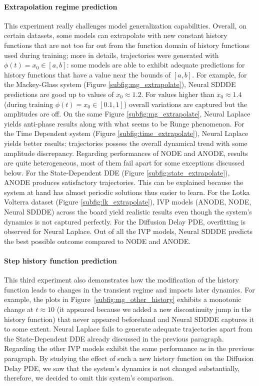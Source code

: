 

\paragraph{Extrapolation regime prediction} This experiment really challenges model generalization capabilities. Overall, on certain datasets, some models can extrapolate with new constant history functions that are not too far out from the function domain of history functions used during training; more in details,  trajectories were generated with $\phi(t) = x_0\in [a,b]$: some models are able to exhibit adequate predictions for history functions that have a value near the bounds of $[a,b]$. For example, for the Mackey-Glass system (Figure \ref{subfig:mg_extrapolate}), Neural SDDDE predictions are good up to values of $x_0 \approx 1.2$. For values higher than  $x_0 \approx 1.4$ (during training $\phi(t) = x_0 \in [0.1,1] $) overall variations are captured but the amplitudes are off. On the same Figure \ref{subfig:mg_extrapolate}, Neural Laplace yields anti-phase results along with what seems to be Runge phenomenon. For the Time Dependent system (Figure \ref{subfig:time_extrapolate}), Neural Laplace yields better results: trajectories possess the overall dynamical trend with some amplitude discrepancy. Regarding performances of NODE and ANODE, results are quite heterogeneous, most of them fail apart for some exceptions discussed below. For the State-Dependent DDE (Figure \ref{subfig:state_extrapolate}), ANODE produces satisfactory trajectories. This can be explained because the system at hand has almost periodic solutions thus easier to learn. For the Lotka Volterra dataset (Figure \ref{subfig:lk_extrapolate}), IVP models (ANODE, NODE, Neural SDDDE) across the board yield realistic results even though the system's dynamics is not captured perfectly. For the Diffusion Delay PDE, overfitting is observed for Neural Laplace. Out of all the IVP models, Neural SDDDE predicts the best possible outcome compared to NODE and ANODE. 



\paragraph{Step history function prediction} This third experiment also demonstrates how the modification of the history function leads to changes in the transient regime and impacts later dynamics. For example, the plots in Figure~\ref{subfig:mg_other_history} exhibits a monotonic change at $t \approx 10$ (it appeared because we added a new discontinuity jump in the history function) that never appeared beforehand and Neural SDDDE captures it to some extent. Neural Laplace fails to generate adequate trajectories apart from the State-Dependent DDE already discussed in the previous paragraph. Regarding the other IVP models exhibit the same performance as in the previous paragraph. By studying the effect of such a new history function on the Diffusion Delay PDE, we saw that the system's dynamics is not changed substantially, therefore, we decided to omit this system's comparison.

